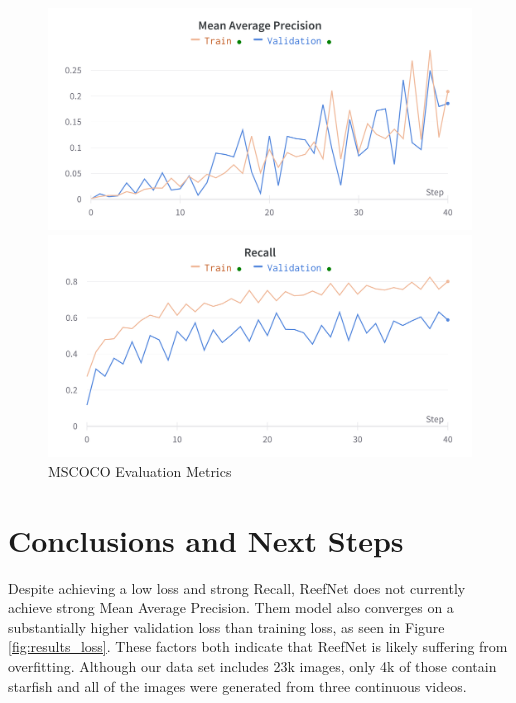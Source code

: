 \documentclass{article}
\begin{document}
\begin{figure}
    \begin{minipage}{0.48\textwidth}
        \includegraphics[width=\textwidth]{mean_average_precision_chart.png}
    \end{minipage}
    \begin{minipage}{0.48\textwidth}
        \includegraphics[width=\textwidth]{recall_chart.png}
    \end{minipage}
    \caption{MSCOCO Evaluation Metrics}
    \label{fig:metrics_eval}
\end{figure}



\section{Conclusions and Next Steps}
Despite achieving a low loss and strong Recall, ReefNet does not currently achieve strong Mean Average Precision.
Them model also converges on a substantially higher validation loss than training loss, as seen in Figure \ref{fig:results_loss}.
These factors both indicate that ReefNet is likely suffering from overfitting.
Although our data set includes 23k images, only 4k of those contain starfish and all of the images were generated from three continuous videos. 
\end{document}
